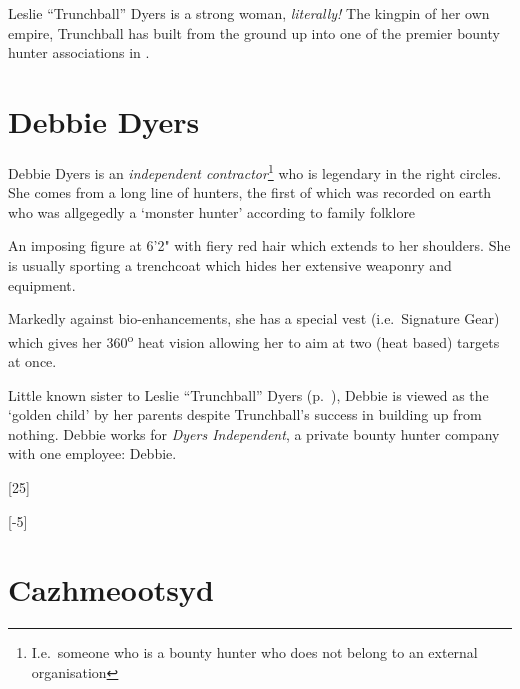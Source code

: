 Leslie ``Trunchball'' Dyers is a strong woman, \emph{literally!} The kingpin of
her own empire, Trunchball has built \thecompany from the ground up into one of
the premier bounty hunter associations in .

\begin{character}
     

\end{character}

\section{Debbie Dyers}
\label{sec:debbie-dyers}

Debbie Dyers is an \emph{independent contractor}\footnote{I.e.~someone who is a
  bounty hunter who does not belong to an external organisation} who is
legendary in the right circles. She comes from a long line of hunters, the first
of which was recorded on earth who was allgegedly a `monster hunter' according
to family folklore

An imposing figure at 6'2" with fiery red hair which extends to her shoulders.
She is usually sporting a trenchcoat which hides her extensive weaponry and
equipment.

Markedly against bio-enhancements, she has a special vest (i.e.~Signature Gear)
which gives her 360\textsuperscript{o} heat vision allowing her to aim at
two (heat based) targets at once.

Little known sister to Leslie ``Trunchball'' Dyers
(p.~\pageref{sec:lesl-trunchb-dyers}), Debbie is viewed as the `golden child' by her
parents despite Trunchball's success in building \thecompany up from nothing.
Debbie works for \emph{Dyers Independent}, a private bounty hunter company with
one employee: Debbie.

\begin{character}
     


  [25]

  [-5]

\end{character}


\section{Cazhmeootsyd}
\label{sec:cazhmeootsyd}

